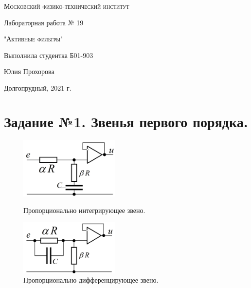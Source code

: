 \documentclass[12pt,a4paper]{article}
\begin{document}
\begin{titlepage}
	\centering
	\vspace{5cm}
	{\scshape\LARGE Московский физико-технический институт \par}
	\vspace{5cm}

	{\huge Лабораторная работа № 19 \par}
	\vspace{1cm}
	{\scshape\Large "Активные фильтры"\par}
	\vspace{2cm}
	\vfill
\begin{flushright}
	{\Large Выполнила студентка Б01-903}\par
	\vspace{0.3cm}
	{\LARGE Юлия Прохорова} \par

	
\end{flushright}
	

	\vfill\large

	Долгопрудный, 2021 г.
\end{titlepage}

\section{Задание №1. Звенья первого порядка.}

\begin{figure}[h]
    \begin{center}
    \begin{minipage}[h]{0.4\linewidth}
    \includegraphics[width=5cm]{интегрирующая.png}
    \caption{Пропорционально интегрирующее звено.}
    \label{integr}
    \end{minipage}
    \hfill
    \begin{minipage}[h]{0.45\linewidth}
        \includegraphics[width=5cm]{дифференцирующая.png}
        \caption{Пропорционально дифференцирующее звено.}
        \label{differ}
    \end{minipage}
    \end{center}
    \end{figure}
\end{document}
